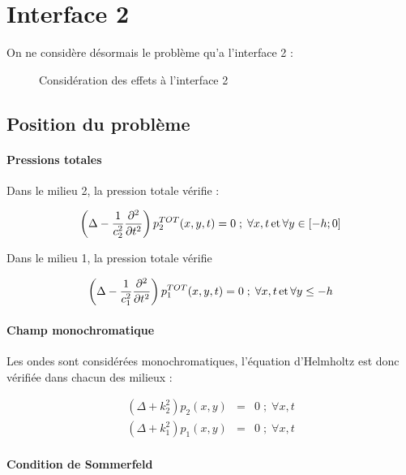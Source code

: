 \section{Interface 2}

On ne considère désormais le problème qu'a l'interface 2 :

\begin{figure}[!h]
    \centering{}
    \caption{\label{iface2} Considération des effets à l'interface 2}
\end{figure}

\subsection{Position du problème}

\paragraph{Pressions totales}
Dans le milieu 2, la pression totale vérifie :

\begin{equation}
    \left(\Delta - \frac{1}{c_2^2}\frac{\partial^2}{\partial t^2}\right)p^{TOT}_2(x,y,t) = 0 \;;\; \forall x,t
    \,\mathrm{et}\, \forall y \in [-h; 0] \label{i2_prop1}
\end{equation}

Dans le milieu 1, la pression totale vérifie

\begin{equation}
    \left(\Delta - \frac{1}{c_1^2}\frac{\partial^2}{\partial t^2}\right)p^{TOT}_1(x,y,t) = 0 \;;\; \forall x,t
    \,\mathrm{et}\, \forall y \leq -h \label{i2_prop2}
\end{equation}

\paragraph{Champ monochromatique} Les ondes sont considérées monochromatiques, l'équation d'Helmholtz est donc vérifiée
dans chacun des milieux :

\begin{eqnarray}
    (\Delta + k_2^2)p_2(x,y) & = & 0 \;;\; \forall x,t \label{i2_helm1}\\
    (\Delta + k_1^2)p_1(x,y) & = & 0 \;;\; \forall x,t \label{i2_helm2}
\end{eqnarray}

\paragraph{Condition de Sommerfeld}

